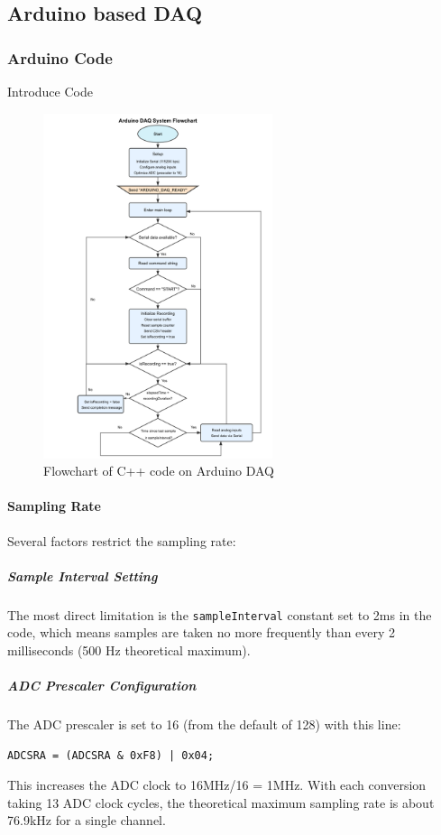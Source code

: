 \subsection{Arduino based DAQ}
\subsubsection{Arduino Code}
Introduce Code
\begin{figure}[htbp] %
  \centering
  \includegraphics[width=0.6\textwidth]{chapters/methodology/ArduinoDAQ/flowchart_Arduino_code.png} %
  \caption{Flowchart of C++ code on Arduino DAQ}      
  \label{fig:daq_arduino_code}           
\end{figure}                            
\paragraph{Sampling Rate}
Several factors restrict the sampling rate:

\subparagraph{Sample Interval Setting}
The most direct limitation is the \texttt{sampleInterval} constant set to 2ms in the code, which means samples are taken no more frequently than every 2 milliseconds (500 Hz theoretical maximum).

\subparagraph{ADC Prescaler Configuration}
The ADC prescaler is set to 16 (from the default of 128) with this line:
\begin{verbatim}
ADCSRA = (ADCSRA & 0xF8) | 0x04;
\end{verbatim}
This increases the ADC clock to 16MHz/16 = 1MHz. With each conversion taking 13 ADC clock cycles, the theoretical maximum sampling rate is about 76.9kHz for a single channel.

